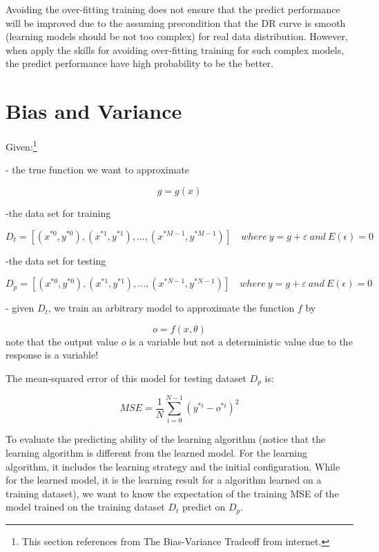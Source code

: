 \documentclass[runningheads,openany]{xhlPaper}
\begin{document}
Avoiding the over-fitting training does not ensure that the predict performance will be improved due to the assuming precondition that the DR curve is smooth  (learning models should be not too complex) for real data distribution. However, when apply the skills for avoiding over-fitting training for such complex models, the predict performance have high probability to be the better.

\section{Bias and Variance}
Given:\footnote{This section references from The Bias-Variance Tradeoff from internet.}

- the true function we want to approximate

\begin{displaymath}
g=g\left(x\right)
\end{displaymath}

-the data set for training

\begin{displaymath}
D_t=\left[\left(x^{*0},y^{*0}\right),\left(x^{*1},y^{*1}\right),...,\left(x^{*M-1},y^{*M-1}\right)\right]\quad where\ y = g + \varepsilon\ and\ E\left(\epsilon\right)=0
\end{displaymath}

-the data set for testing

\begin{displaymath}
D_p=\left[\left(x^{*0},y^{*0}\right),\left(x^{*1},y^{*1}\right),...,\left(x^{*N-1},y^{*N-1}\right)\right]\quad where\ y = g + \varepsilon\ and\ E\left(\epsilon\right)=0
\end{displaymath}

- given ${D_t}$, we train an arbitrary model to approximate the function $f$ by

\begin{displaymath}
o=f\left(x,\theta\right)
\end{displaymath}
note that the output value ${o}$ is a variable but not a deterministic value due to the response is a variable!

The mean-squared error of this model for testing dataset ${D_p}$ is:

\begin{displaymath}
MSE=\frac{1}{N}{\sum_{i=0}^{N-1}\left ( y^{*i}-o^{*i} \right )^2}
\end{displaymath}

To evaluate the predicting ability of the learning algorithm (notice that the learning algorithm is different from the learned model. For the learning algorithm, it includes the learning strategy and the initial configuration. While for the learned model, it is the learning result for a algorithm learned on a training dataset), we want to know the expectation of the training MSE of the model trained on the training dataset $D_t$ predict on $D_p$.
\end{document}
